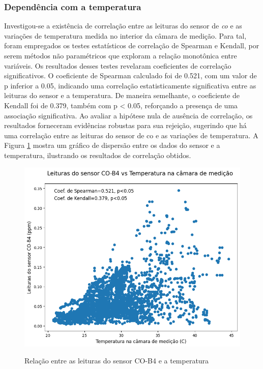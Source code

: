 \subsubsection{Dependência com a temperatura}

Investigou-se a existência de correlação entre as leituras do sensor de \textit{co} e as variações de temperatura medida no interior da câmara de medição. Para tal, foram empregados os testes estatísticos de correlação de Spearman e Kendall, por serem métodos não paramétricos que exploram a relação monotônica entre variáveis. Os resultados desses testes revelaram coeficientes de correlação significativos. O coeficiente de Spearman calculado foi de 0.521, com um valor de p inferior a 0.05, indicando uma correlação estatisticamente significativa entre as leituras do sensor e a temperatura. De maneira semelhante, o coeficiente de Kendall foi de 0.379, também com p < 0.05, reforçando a presença de uma associação significativa. Ao avaliar a hipótese nula de ausência de correlação, os resultados forneceram evidências robustas para sua rejeição, sugerindo que há uma correlação entre as leituras do sensor de \acrshort{co} e as variações de temperatura. A Figura \ref{fig:data-temp-co-corr} mostra um gráfico de dispersão entre os dados do sensor e a temperatura, ilustrando os resultados de correlação obtidos.

\begin{figure}[h]
    \centering
    \caption{Relação entre as leituras do sensor CO-B4 e a temperatura}
    \includegraphics[width=\textwidth]{chapters/3-RESULTADOS CAMPO/Figuras/temperature-co-b4.png}
    \label{fig:data-temp-co-corr}
\end{figure}

